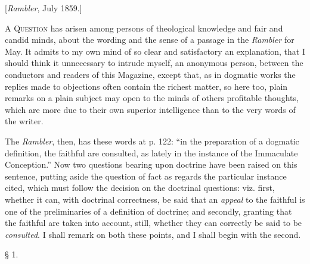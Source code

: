 [\emph{Rambler}, July 1859.]

A Q\textsc{uestion} has arisen among
persons of theological knowledge and fair and candid minds, about the
wording and the sense of a passage in the \emph{Rambler} for May. It admits to my own mind of so clear and satisfactory
an explanation, that I should think it unnecessary to intrude myself, an
anonymous person, between the conductors and readers of this Magazine,
except that, as in dogmatic works the replies made to objections often
contain the richest matter, so here too, plain remarks on a plain
subject may open to the minds of others profitable thoughts, which are
more due to their own superior intelligence than to the very words of
the writer.

The \emph{Rambler},
then, has these words at p. 122: ``in the preparation of a
dogmatic definition, the faithful are consulted, as lately in the
instance of the Immaculate Conception.'' Now two questions bearing
upon doctrine have been raised on this sentence, putting aside the
question of fact as regards the particular instance cited, which must
follow the decision on the doctrinal questions: viz. first, whether it
can, with doctrinal correctness, be said that an \emph{appeal} to the
faithful is one of the preliminaries of a definition of doctrine; and
secondly, granting that the faithful are taken into account, still,
whether they can correctly be said to be \emph{consulted}. I shall
remark on both these points, and I shall begin with the second.

§ 1.

